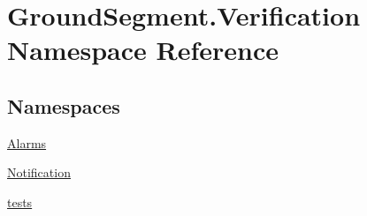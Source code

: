 \hypertarget{namespace_ground_segment_1_1_verification}{}\section{Ground\+Segment.\+Verification Namespace Reference}
\label{namespace_ground_segment_1_1_verification}
\subsection*{Namespaces}
\begin{DoxyCompactItemize}
\item 
 \hyperlink{namespace_ground_segment_1_1_verification_1_1_alarms}{Alarms}
\item 
 \hyperlink{namespace_ground_segment_1_1_verification_1_1_notification}{Notification}
\item 
 \hyperlink{namespace_ground_segment_1_1_verification_1_1tests}{tests}
\end{DoxyCompactItemize}

